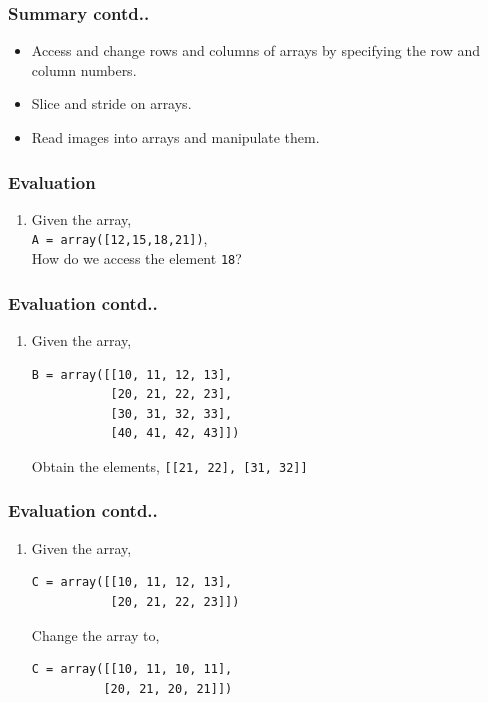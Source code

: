 \documentclass[17pt,compress]{beamer}
\newcounter{saveenumi}
\newcommand{\seti}{\setcounter{saveenumi}{\value{enumi}}}
\newcommand{\conti}{\setcounter{enumi}{\value{saveenumi}}}
\begin{document}
\begin{frame}
\frametitle{Summary contd..}
\label{sec-13.2}

\begin{itemize}
\item Access and change rows and columns of arrays by specifying the row 
    and column numbers.
\item Slice and stride on arrays.
\item Read images into arrays and manipulate them.
\end{itemize}
\end{frame}
\begin{frame}
\frametitle{Evaluation}
\label{sec-14.1}


\begin{enumerate}
\item Given the array,\\ \texttt{A = array([12,15,18,21])},\\ How do we access the element \texttt{18}?
\vspace{2pt}
\seti
\end{enumerate}
\end{frame}
\begin{frame}[fragile]
\frametitle{Evaluation contd..}
\label{sec-14.2}
\begin{enumerate}
\conti
\item Given the array,

\lstset{language=Python}
\begin{lstlisting}
B = array([[10, 11, 12, 13],
           [20, 21, 22, 23],
           [30, 31, 32, 33],
           [40, 41, 42, 43]])
\end{lstlisting}
Obtain the elements, \texttt{[[21, 22], [31, 32]]}
\seti
\end{enumerate}
\end{frame}
\begin{frame}[fragile]
\frametitle{Evaluation contd..}
\label{sec-14.2}
\begin{enumerate}
\conti
\item Given the array,
\lstset{language=Python}
\begin{lstlisting}
C = array([[10, 11, 12, 13],   
           [20, 21, 22, 23]])
\end{lstlisting}
Change the array to, 
\begin{lstlisting}
C = array([[10, 11, 10, 11],
          [20, 21, 20, 21]])
\end{lstlisting}
\end{enumerate}
\end{frame}
\end{document}

